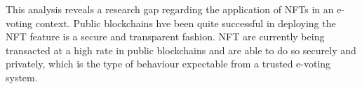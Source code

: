 \documentclass[../main.tex]{subfiles}
\begin{document}
\par
This analysis reveals a research gap regarding the application of NFTs in an e-voting context. Public blockchains hve been quite successful in deploying the NFT feature is a secure and transparent fashion. NFT are currently being transacted at a high rate in public blockchains and are able to do so securely and privately, which is the type of behaviour expectable from a trusted e-voting system.
\end{document}
